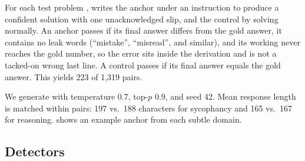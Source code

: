 For each \gsm test problem \citep{cobbe2021training}, \qwen writes the anchor under an instruction to produce a confident solution with one unacknowledged slip, and the control by solving normally.
An anchor passes if its final answer differs from the gold answer, it contains no leak words (``mistake'', ``misread'', and similar), and its working never reaches the gold number, so the error sits inside the derivation and is not a tacked-on wrong last line.
A control passes if its final answer equals the gold answer.
This yields 223 of 1,319 pairs.

We generate with temperature 0.7, top-$p$ 0.9, and seed 42.
Mean response length is matched within pairs: 197 vs.\ 188 characters for sycophancy and 165 vs.\ 167 for reasoning.
 shows an example anchor from each subtle domain.

\subsection{Detectors}
\label{sec:detectors}

\begin{table}[t]
\centering
\caption{Detectors. Every detector sees the same input in every domain: the user request and the response. Detectors 1--5 form the standard battery; detectors 6--7 are the rubric ablation and apply to the two subtle domains only.}
\label{tab:detectors}
\end{table}

